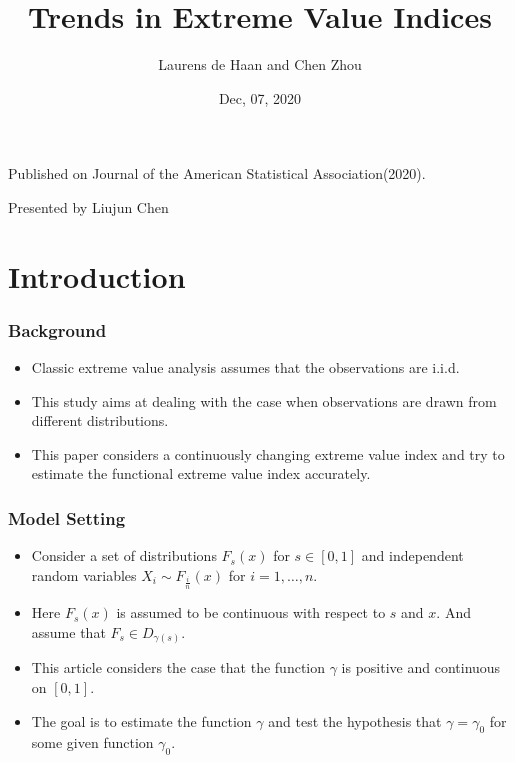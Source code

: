 \documentclass{beamer}
\author{Laurens de Haan and Chen Zhou }
\date{Dec, 07, 2020}
\title{Trends in Extreme Value Indices}
\begin{document}
\begin{frame}
\titlepage
\begin{center}
    Published on Journal of the American Statistical Association(2020).

    \bigskip
    Presented by Liujun Chen

\end{center}
\end{frame}




\section{Introduction}

\begin{frame}
    \frametitle{Background}
\begin{itemize}
    \item Classic extreme value analysis assumes that the observations are i.i.d.
    \bigskip
    \item This study aims at dealing with the case when observations are drawn from different distributions.
    \bigskip
    \item This paper considers a continuously changing extreme value index and try to estimate the functional extreme value index accurately.
\end{itemize}
\end{frame}

\begin{frame}
    \frametitle{Model Setting}
\begin{itemize}
    \item Consider a set of distributions $F_s(x)$ for $s\in [0,1]$ and independent random variables $X_i\sim F_{\frac{i}{n}}(x)$ for $i=1,\dots,n$.
    \medskip
    \item Here $F_s(x)$ is assumed to be continuous with respect to $s$ and $x$. And assume that $F_s \in D_{\gamma(s)}$.
    \medskip
    \item This article considers the case that the function $\gamma$ is positive and continuous on $[0,1]$.
    \medskip
    \item The goal is to estimate the function $\gamma$ and test the hypothesis that $\gamma=\gamma_0$ for some given function $\gamma_0$.
\end{itemize}

\end{frame}
\end{document}
